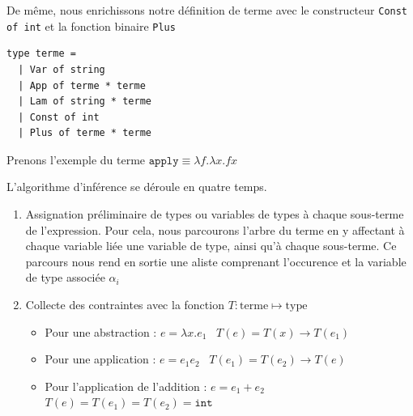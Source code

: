 De même, nous enrichissons notre définition de terme avec le constructeur \texttt{Const of int} et la fonction binaire  \texttt{Plus} 
\begin{Verbatim}
type terme = 
  | Var of string 
  | App of terme * terme 
  | Lam of string * terme
  | Const of int
  | Plus of terme * terme
\end{Verbatim}

Prenons l'exemple du terme 
$\mathtt{apply} \equiv \lambda f . \lambda x .fx$

L'algorithme d'inférence se déroule en quatre temps.

\begin{enumerate}
  \item Assignation préliminaire de types ou variables de types à chaque sous-terme de l'expression.
  Pour cela, nous parcourons  l'arbre du terme en y affectant à chaque variable liée une variable de type, ainsi qu'à
  chaque sous-terme. Ce parcours nous rend en sortie une aliste comprenant l'occurence et la variable de type associée $\alpha_i$
 \begin{center} 
\end{center}

  \item Collecte des contraintes avec la fonction $T: \mathrm{terme} \mapsto \mathrm{type}$ 
    \begin{itemize}
      \item Pour une abstraction :  $e = \lambda x.e_1 $ \imp\ $T(e) = T(x) \rightarrow T(e_1) $
      \item Pour une application :  $e = e_1 e_2$ \imp\ $T(e_1) = T(e_2) \rightarrow T(e) $
      \item Pour l'application de l'addition  : $e=e_1+e_2$ \imp\ $T(e)= T(e_1) = T(e_2) = \mathtt{int} $
    \end{itemize}  


\end{enumerate}
